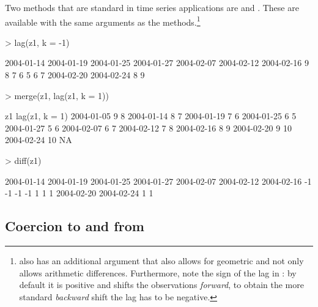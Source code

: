 \documentclass{Z}
\begin{document}
Two methods that are standard in time series applications
are  and . These are available with the same
arguments as the  methods.\footnote{ also
has an additional argument that also allows for geometric and
not only allows arithmetic differences. Furthermore, note the sign
of the lag in : by default it is positive and shifts the 
observations \emph{forward}, to obtain the more standard \emph{backward}
shift the lag has to be negative.}

\begin{Schunk}
\begin{Sinput}
> lag(z1, k = -1)
\end{Sinput}
\begin{Soutput}
2004-01-14 2004-01-19 2004-01-25 2004-01-27 2004-02-07 2004-02-12 2004-02-16 
         9          8          7          6          5          6          7 
2004-02-20 2004-02-24 
         8          9 
\end{Soutput}
\begin{Sinput}
> merge(z1, lag(z1, k = 1))
\end{Sinput}
\begin{Soutput}
           z1 lag(z1, k = 1)
2004-01-05  9  8            
2004-01-14  8  7            
2004-01-19  7  6            
2004-01-25  6  5            
2004-01-27  5  6            
2004-02-07  6  7            
2004-02-12  7  8            
2004-02-16  8  9            
2004-02-20  9 10            
2004-02-24 10 NA            
\end{Soutput}
\begin{Sinput}
> diff(z1)
\end{Sinput}
\begin{Soutput}
2004-01-14 2004-01-19 2004-01-25 2004-01-27 2004-02-07 2004-02-12 2004-02-16 
        -1         -1         -1         -1          1          1          1 
2004-02-20 2004-02-24 
         1          1 
\end{Soutput}
\end{Schunk}



\subsection[Coercion to and from "zoo"]{Coercion to and from }
\label{sec:as.zoo}
\end{document}
